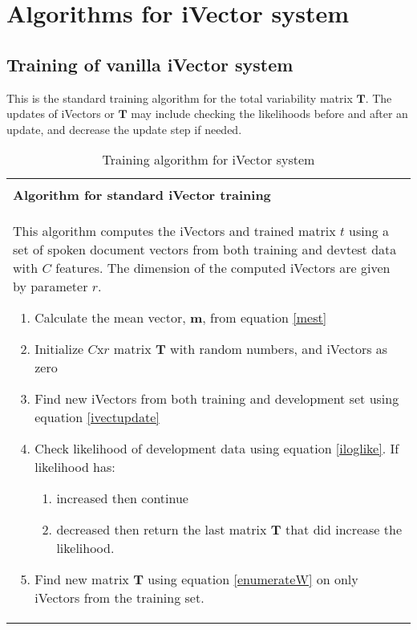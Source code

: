 \chapter{Algorithms for iVector system}

\section{Training of vanilla iVector system}
\label{ap:vanivecttrain}

This is the standard training algorithm for the total variability matrix $\mathbf{T}$. The updates of iVectors or $\mathbf{T}$ may include checking the likelihoods before and after an update, and decrease the update step if needed.

\begin{table}
\begin{tabular}{ | p{12cm} | }
\hline
\\
\textbf{Algorithm for standard iVector training}
\\
This algorithm computes the iVectors and trained matrix $t$ using a set of spoken document vectors from both training and devtest data with $C$ features. The dimension of the computed iVectors are given by parameter $r$.
\begin{enumerate}
  \item Calculate the mean vector, $\mathbf{m}$, from equation \ref{mest} 
  \item Initialize $C$x$r$ matrix $\mathbf{T}$ with random numbers, and iVectors as zero
  \item \label{enumerateW} Find new iVectors from both training and development set using equation \ref{ivectupdate}
  \item \label{stopcondition} Check likelihood of development data using equation \ref{iloglike}. If likelihood has:
  \begin{enumerate}
    \item increased then continue
    \item decreased then return the last matrix $\mathbf{T}$ that did increase the likelihood.
  \end{enumerate}
  \item \label{enumerateT} Find new matrix $\mathbf{T}$ using equation \ref{enumerateW} on only iVectors from the training set.

\end{enumerate}
\\
\hline
\end{tabular}
\caption{Training algorithm for iVector system}
\label{algtrain}
\end{table}